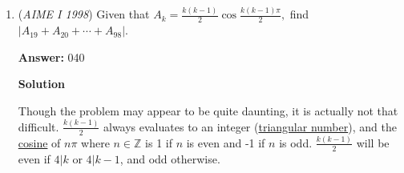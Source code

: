 \begin{enumerate}
 



\textbf{Solution 5}

We find that there are $84$ ways to choose $3$ tiles. We can make an odd sum by picking $3$ odd tiles and $0$ even or $1$ odd tile and $2$ even tiles. We will use casework to solve this problem.

 Case $1$: The first player picks $3$ odd tiles. This has a probability of $\frac{5}{42}$. The second player must pick $1$ odd $2 even$ with probability of $\frac{3}{5}$. The last player is forced to pick an odd sum. The probability of case $1$ is therefore $\frac{1}{14}$.

 Case $2$: The first player picks $1$ odd and $2$ even tiles. This has probability of $\frac{5}{42}$. We now break up the remainder of this case into $2$ subcases.

 \begin{verbatim}
	-Subcase $1$: The second player picks $3$ odd and $0$ even. This has probability of $\frac{1}{5}$. This forces the third player to create an odd sum, so the probability of this subcase is $\frac{1}{14}$.
\end{verbatim}

\begin{verbatim}
	-Subcase $2$: The second player picks $1$ odd and $2$ even. This has probability of $\frac{1}{5}$. This subcase also has probability of $\frac{1}{14}$.
\end{verbatim}

Case $2$ therfore has total probability of $\frac{1}{7}$. We add our cases and add the numerator and denominator to find that the answer is $\boxed{17}$.~jamespudi

 


	\item (\textit{AIME I 1998}) Given that $A_k = \frac {k(k - 1)}2\cos\frac {k(k - 1)\pi}2,$ find $\left\lvert A_{19} + A_{20} + \cdots + A_{98}\right\rvert.$

 \textbf{Answer: }040



\textbf{Solution}

Though the problem may appear to be quite daunting, it is actually not that difficult. $\frac {k(k-1)}2$ always evaluates to an integer (\href{https://artofproblemsolving.com/wiki/index.php?title=Triangular\_number}{triangular number}), and the \href{https://artofproblemsolving.com/wiki/index.php?title=Cosine}{cosine} of $n\pi$ where $n \in \mathbb{Z}$ is 1 if $n$ is even and -1 if $n$ is odd. $\frac {k(k-1)}2$ will be even if $4|k$ or $4|k-1$, and odd otherwise.  


\end{enumerate}
